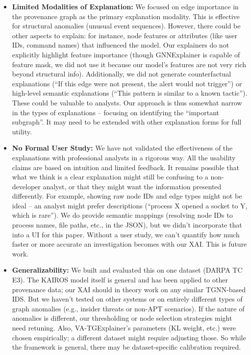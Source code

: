 \documentclass[conference]{IEEEtran}
\begin{document}
\begin{itemize}
    \item \textbf{Limited Modalities of Explanation:} We focused on edge importance in the provenance graph as the primary explanation modality. This is effective for structural anomalies (unusual event sequences). However, there could be other aspects to explain: for instance, node features or attributes (like user IDs, command names) that influenced the model. Our explainers do not explicitly highlight feature importance (though GNNExplainer is capable of feature mask, we did not use it because our model's features are not very rich beyond structural info). Additionally, we did not generate counterfactual explanations (``If this edge were not present, the alert would not trigger'') or high-level semantic explanations (``This pattern is similar to a known tactic''). These could be valuable to analysts. Our approach is thus somewhat narrow in the types of explanations -- focusing on identifying the ``important subgraph''. It may need to be extended with other explanation forms for full utility.
    \item \textbf{No Formal User Study:} We have not validated the effectiveness of the explanations with professional analysts in a rigorous way. All the usability claims are based on intuition and limited feedback. It remains possible that what we think is a clear explanation might still be confusing to a non-developer analyst, or that they might want the information presented differently. For example, showing raw node IDs and edge types might not be ideal -- an analyst might prefer descriptions (``process X opened a socket to Y, which is rare''). We do provide semantic mappings (resolving node IDs to process names, file paths, etc., in the JSON), but we didn't incorporate that into a UI for this paper. Without a user study, we can't quantify how much faster or more accurate an investigation becomes with our XAI. This is future work.
    \item \textbf{Generalizability:} We built and evaluated this on one dataset (DARPA TC E3). The KAIROS model itself is general and has been applied to other provenance data; our XAI should in theory work on any similar TGNN-based IDS. But we haven't tested on other systems or on entirely different types of graph anomalies (e.g., insider threats or non-APT scenarios). If the nature of anomalies is different, our thresholding or node selection strategies might need retuning. Also, VA-TGExplainer's parameters (KL weight, etc.) were chosen empirically; a different dataset might require adjusting those. So while the framework is general, there may be dataset-specific calibration required.

\end{itemize}
\end{document}
